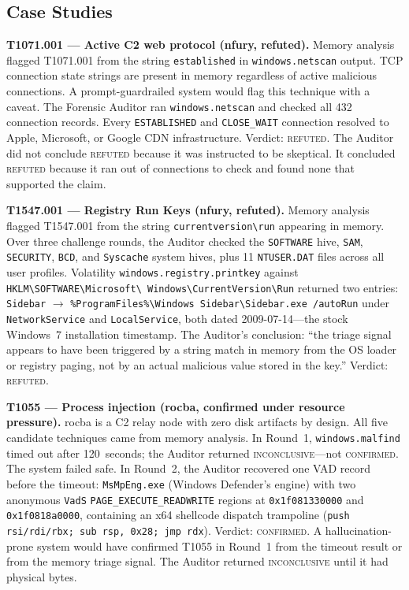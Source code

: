 \documentclass[sigconf, nonacm]{acmart}
\begin{document}
\subsection{Case Studies}

\textbf{T1071.001 --- Active C2 web protocol (nfury, refuted).}
Memory analysis flagged T1071.001 from the string \texttt{established} in
\texttt{windows.netscan} output. TCP connection state strings are present in
memory regardless of active malicious connections. A prompt-guardrailed system
would flag this technique with a caveat. The Forensic Auditor ran
\texttt{windows.netscan} and checked all 432 connection records. Every
\texttt{ESTABLISHED} and \texttt{CLOSE\_WAIT} connection resolved to Apple,
Microsoft, or Google CDN infrastructure. Verdict: \textsc{refuted}. The Auditor
did not conclude \textsc{refuted} because it was instructed to be skeptical. It
concluded \textsc{refuted} because it ran out of connections to check and found
none that supported the claim.

\textbf{T1547.001 --- Registry Run Keys (nfury, refuted).}
Memory analysis flagged T1547.001 from the string \texttt{currentversion\textbackslash run}
appearing in memory. Over three challenge rounds, the Auditor checked the
\texttt{SOFTWARE} hive, \texttt{SAM}, \texttt{SECURITY}, \texttt{BCD}, and
\texttt{Syscache} system hives, plus 11 \texttt{NTUSER.DAT} files across all
user profiles. Volatility \texttt{windows.registry.printkey} against
\texttt{HKLM\textbackslash SOFTWARE\textbackslash Microsoft\textbackslash
Windows\textbackslash CurrentVersion\textbackslash Run} returned two entries:
\texttt{Sidebar} $\to$ \texttt{\%ProgramFiles\%\textbackslash Windows
Sidebar\textbackslash Sidebar.exe /autoRun} under \texttt{NetworkService} and
\texttt{LocalService}, both dated 2009-07-14---the stock Windows~7 installation
timestamp. The Auditor's conclusion: ``the triage signal appears to have been
triggered by a string match in memory from the OS loader or registry paging, not
by an actual malicious value stored in the key.'' Verdict: \textsc{refuted}.

\textbf{T1055 --- Process injection (rocba, confirmed under resource pressure).}
rocba is a C2 relay node with zero disk artifacts by design. All five candidate
techniques came from memory analysis. In Round~1, \texttt{windows.malfind}
timed out after 120~seconds; the Auditor returned \textsc{inconclusive}---not
\textsc{confirmed}. The system failed safe. In Round~2, the Auditor recovered
one VAD record before the timeout: \texttt{MsMpEng.exe} (Windows Defender's
engine) with two anonymous \texttt{VadS} \texttt{PAGE\_EXECUTE\_READWRITE}
regions at \texttt{0x1f081330000} and \texttt{0x1f0818a0000}, containing an
x64 shellcode dispatch trampoline (\texttt{push rsi/rdi/rbx; sub rsp, 0x28;
jmp rdx}). Verdict: \textsc{confirmed}. A hallucination-prone system would have
confirmed T1055 in Round~1 from the timeout result or from the memory triage
signal. The Auditor returned \textsc{inconclusive} until it had physical bytes.
\end{document}
